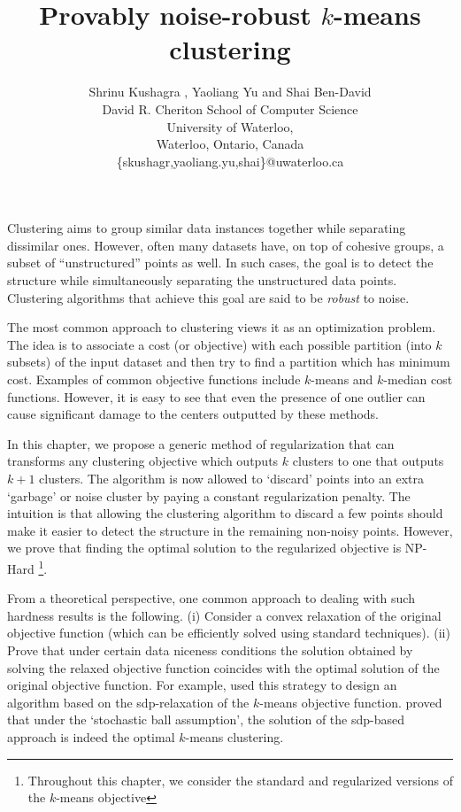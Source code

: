 \documentclass[12pt]{article}
\title{Provably noise-robust $k$-means clustering}
\author{\normalsize
{Shrinu Kushagra} {\textnormal {,}} {Yaoliang Yu} {\textnormal {and}} {Shai Ben-David} \\
\normalsize David R. Cheriton School of Computer Science \\
\normalsize University of Waterloo,\\
\normalsize Waterloo, Ontario, Canada\\
\normalsize \{skushagr,yaoliang.yu,shai\}@uwaterloo.ca \\
}
\begin{document}
\fi

Clustering aims to group similar data instances together while separating dissimilar ones. However, often many datasets have, on top of cohesive groups, a subset of ``unstructured'' points as well. In such cases, the goal is to detect the structure while simultaneously separating the unstructured data points. Clustering algorithms that achieve this goal are said to be {\em robust} to noise.

The most common approach to clustering views it as an optimization problem. The idea is to associate a cost (or objective) with each possible partition (into $k$ subsets) of the input dataset and then try to find a partition which has minimum cost. Examples of common objective functions include $k$-means and $k$-median cost functions. However, it is easy to see that even the presence of one outlier can cause significant damage to the centers outputted by these methods.

In this chapter, we propose a generic method of regularization that can transforms any clustering objective which outputs $k$ clusters to one that outputs $k+1$ clusters. The algorithm is now allowed to `discard' points into an extra `garbage' or noise cluster by paying a constant regularization penalty. The intuition is that allowing the clustering algorithm to discard a few points should make it easier to detect the structure in the remaining non-noisy points. However, we prove that finding the optimal solution to the regularized objective is NP-Hard \footnote{Throughout this chapter, we consider the standard and regularized versions of the $k$-means objective}. 

From a theoretical perspective, one common approach to dealing with such hardness results is the following. (i) Consider a convex relaxation of the original objective function (which can be efficiently solved using standard techniques). (ii) Prove that under certain data niceness conditions the solution obtained by solving the relaxed objective function coincides with the optimal solution of the original objective function. For example, \cite{peng2007approximating} used this strategy to design an algorithm based on the sdp-relaxation of the $k$-means objective function. \cite{awasthi2015relax} proved that under the `stochastic ball assumption', the solution of the sdp-based approach is indeed the optimal $k$-means clustering. 
\end{document}
